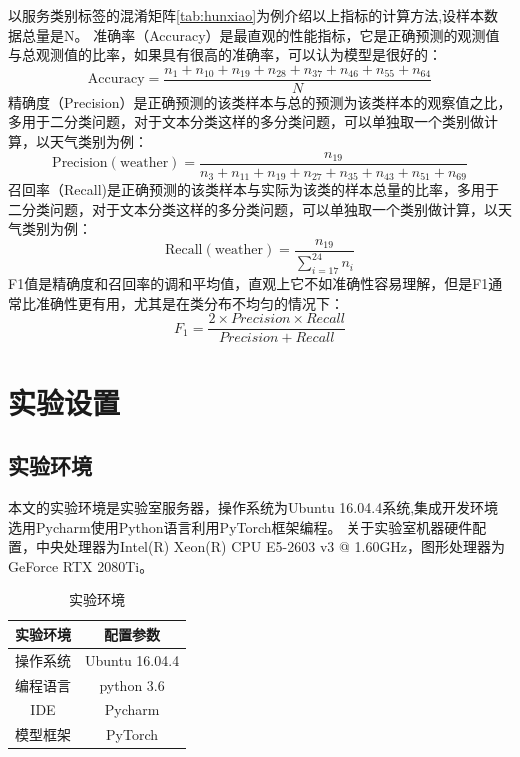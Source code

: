   以服务类别标签的混淆矩阵\ref{tab:hunxiao}为例介绍以上指标的计算方法,设样本数据总量是N。
  准确率（Accuracy）是最直观的性能指标，它是正确预测的观测值与总观测值的比率，如果具有很高的准确率，可以认为模型是很好的：
  \begin{equation}
  \text {Accuracy}=\frac{n_1+n_{10}+n_{19}+n_{28}+n_{37}+n_{46}+n_{55}+n_{64}}{N}
\end{equation}
精确度（Precision）是正确预测的该类样本与总的预测为该类样本的观察值之比，多用于二分类问题，对于文本分类这样的多分类问题，可以单独取一个类别做计算，以天气类别为例：
\begin{equation}
  \text {Precision}(\text {weather})=\frac{n_{19}}{n_3+n_{11}+n_{19}+n_{27}+n_{35}+n_{43}+n_{51}+n_{69}}
\end{equation}
召回率（Recall)是正确预测的该类样本与实际为该类的样本总量的比率，多用于二分类问题，对于文本分类这样的多分类问题，可以单独取一个类别做计算，以天气类别为例：
\begin{equation}
  \text {Recall}(\text {weather})=\frac{n_{19}}{\sum_{i=17}^{24} n_{i}}
\end{equation}
F1值是精确度和召回率的调和平均值，直观上它不如准确性容易理解，但是F1通常比准确性更有用，尤其是在类分布不均匀的情况下：
\begin{equation}
  F_1=\frac{2 \times Precision \times Recall}{ Precision + Recall}
\end{equation}

\section{实验设置}
\subsection{实验环境}
本文的实验环境是实验室服务器，操作系统为Ubuntu 16.04.4系统,集成开发环境选用Pycharm使用Python语言利用PyTorch框架编程。
关于实验室机器硬件配置，中央处理器为Intel(R) Xeon(R) CPU E5-2603 v3 @ 1.60GHz，图形处理器为GeForce RTX 2080Ti。

\begin{table}[htb]
  \centering
  \caption{实验环境}
  \label{tab:huanjing}
\begin{tabular}{c|c}
\hline
实验环境&配置参数\\
\hline
操作系统&Ubuntu 16.04.4\\
编程语言&python 3.6\\
IDE&Pycharm\\
模型框架&PyTorch\\
\hline
\end{tabular}
\end{table}

